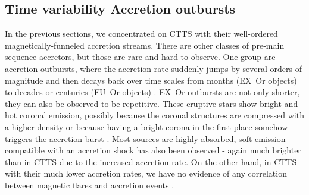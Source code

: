 \subsection{Time variability Accretion outbursts}
In the previous sections, we concentrated on CTTS with their well-ordered magnetically-funneled accretion streams. There are other classes of pre-main sequence accretors, but those are rare and hard to observe. One group are accretion outbursts, where the accretion rate suddenly jumps by several orders of magnitude and then decays back over time scales from months (EX~Or objects) to decades or centuries (FU~Or objects) \cite{2014prpl.conf..387A}. EX~Or outbursts are not only shorter, they can also be observed to be repetitive. These eruptive stars show bright and hot coronal emission, possibly because the coronal structures are compressed with a higher density or because having a bright corona in the first place somehow triggers the accretion burst \cite{2011ApJ...741...83T,2019ApJ...883..117K}. Most sources are highly absorbed, soft emission compatible with an accretion shock has also been observed \cite{2010A&A...522A..56G} - again much brighter than in CTTS due to the increased accretion rate. 
On the other hand, in CTTS with their much lower accretion rates, we have no evidence of any correlation between magnetic flares and accretion events \cite{1997A&A...324..155G,2019ApJ...876..121E}.